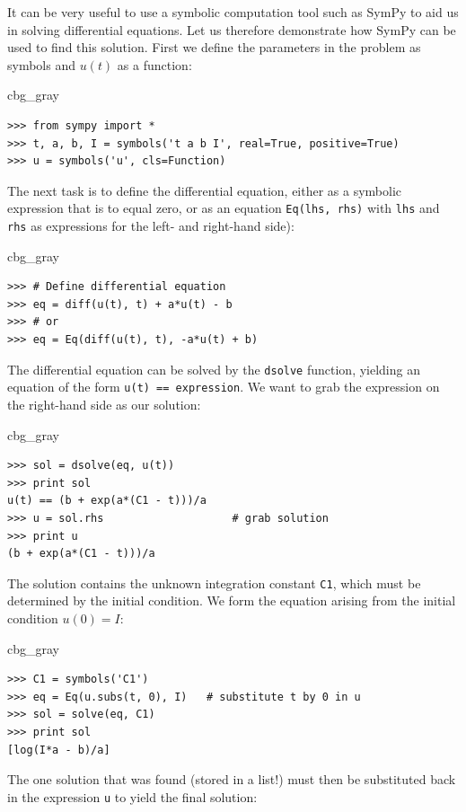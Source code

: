 \documentclass[graybox,envcountchap,sectrefs,final]{svmonodo}
\newenvironment{_cod_tight}[1]{
   \def\FrameCommand{\colorbox{#1}}
   \FrameRule0.6pt\MakeFramed {\FrameRestore}\vskip3mm}
   {\vskip0mm\endMakeFramed}
\newenvironment{cod}[1]{
\bgroup\rmfamily
\fboxsep=0mm\relax
\begin{_cod_tight}{#1}
\list{}{\parsep=-2mm\parskip=0mm\topsep=0pt\leftmargin=2mm
\rightmargin=2\leftmargin\leftmargin=4pt\relax}
\item\relax}
{\endlist\end{_cod_tight}\egroup}
\newenvironment{notice_mdfboxadmon}[1][]{
\begin{notice_mdfboxmdframed}[frametitle=#1]
}
{
\end{notice_mdfboxmdframed}
}
\begin{document}
\begin{notice_mdfboxadmon}
It can be very useful to use a symbolic computation tool such as SymPy
to aid us in solving differential equations.
Let us therefore demonstrate how SymPy can be used to find this solution.
First we define the parameters in the problem as symbols
and $u(t)$ as a function:

\begin{cod}{cbg_gray}\begin{Verbatim}[numbers=none,fontsize=\fontsize{9pt}{9pt},baselinestretch=0.95,xleftmargin=2mm]
>>> from sympy import *
>>> t, a, b, I = symbols('t a b I', real=True, positive=True)
>>> u = symbols('u', cls=Function)
\end{Verbatim}
\end{cod}
\noindent
The next task is to define the differential equation, either as
a symbolic expression that is to equal zero, or as
an equation \texttt{Eq(lhs, rhs)} with \texttt{lhs} and \texttt{rhs} as expressions for
the left- and right-hand side):

\begin{cod}{cbg_gray}\begin{Verbatim}[numbers=none,fontsize=\fontsize{9pt}{9pt},baselinestretch=0.95,xleftmargin=2mm]
>>> # Define differential equation
>>> eq = diff(u(t), t) + a*u(t) - b
>>> # or
>>> eq = Eq(diff(u(t), t), -a*u(t) + b)
\end{Verbatim}
\end{cod}
\noindent
The differential equation can be solved by the \texttt{dsolve} function, yielding
an equation of the form \texttt{u(t) == expression}. We want to grab the
expression on the right-hand side as our solution:

\begin{cod}{cbg_gray}\begin{Verbatim}[numbers=none,fontsize=\fontsize{9pt}{9pt},baselinestretch=0.95,xleftmargin=2mm]
>>> sol = dsolve(eq, u(t))
>>> print sol
u(t) == (b + exp(a*(C1 - t)))/a
>>> u = sol.rhs                    # grab solution
>>> print u
(b + exp(a*(C1 - t)))/a
\end{Verbatim}
\end{cod}
\noindent
The solution contains the unknown integration constant \texttt{C1}, which must
be determined by the initial condition. We form the equation arising
from the initial condition $u(0)=I$:

\begin{cod}{cbg_gray}\begin{Verbatim}[numbers=none,fontsize=\fontsize{9pt}{9pt},baselinestretch=0.95,xleftmargin=2mm]
>>> C1 = symbols('C1')
>>> eq = Eq(u.subs(t, 0), I)   # substitute t by 0 in u
>>> sol = solve(eq, C1)
>>> print sol
[log(I*a - b)/a]
\end{Verbatim}
\end{cod}
\noindent
The one solution that was found (stored in a list!)
must then be substituted back in the
expression \texttt{u} to yield the final solution:


\end{notice_mdfboxadmon}
\end{document}
